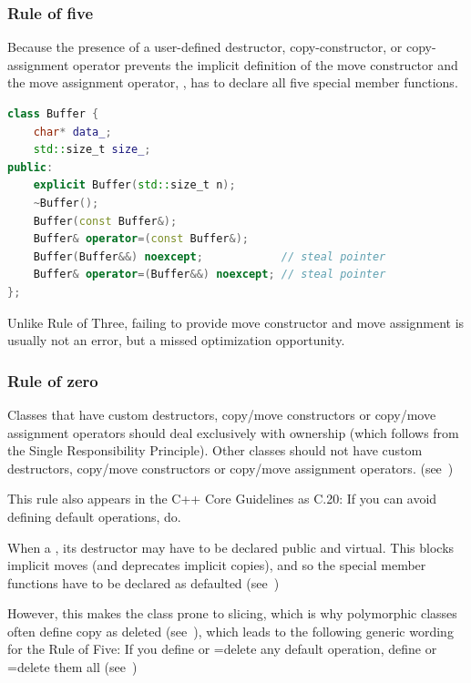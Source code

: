\subsubsection{Rule of five}
\label{subsubsec:c++ruleof5}
Because the presence of a user-defined destructor, copy-constructor, 
or copy-assignment operator prevents the implicit definition of the 
move constructor and the move assignment operator, , has to declare all five special 
member functions.

\begin{lstlisting}[language=C++]
class Buffer {
    char* data_;
    std::size_t size_;
public:
    explicit Buffer(std::size_t n);
    ~Buffer();
    Buffer(const Buffer&);
    Buffer& operator=(const Buffer&);
    Buffer(Buffer&&) noexcept;            // steal pointer
    Buffer& operator=(Buffer&&) noexcept; // steal pointer
};
\end{lstlisting}

Unlike Rule of Three, 
failing to provide move constructor and move assignment 
is usually not an error, 
but a missed optimization opportunity.

\subsubsection{Rule of zero}
\label{subsubsec:c++ruleof0}
Classes that have custom 
destructors, copy/move constructors or copy/move assignment operators 
should deal exclusively with ownership 
(which follows from the Single Responsibility Principle). 
Other classes should not have custom 
destructors, copy/move constructors or copy/move assignment operators.
(see~\cite{fernandes-ruleofzero})

This rule also appears 
in the C++ Core Guidelines as C.20: 
If you can avoid defining default operations, do.

When a , 
its destructor may have to be declared public and virtual. 
This blocks implicit moves (and deprecates implicit copies), 
and so the special member functions have to be declared as defaulted
(see~\cite{meyers-concern-ruleof0})

However, this makes the class prone to slicing, 
which is why polymorphic classes often 
define copy as deleted 
(see~\cite{cppcoreguidelines-C67}), 
which leads to the following generic wording for the Rule of Five:
If you define or =delete any default operation, 
define or =delete them all
(see~\cite{cppcoreguidelines-C21})

